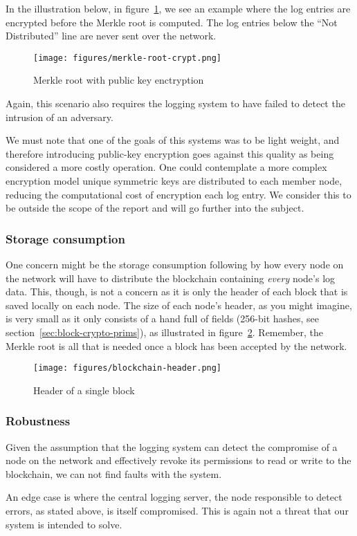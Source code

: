 In the illustration below, in figure~\ref{fig:merkle-root-crypt}, we
see an example where the log entries are encrypted before the Merkle
root is computed. The log entries below the ``Not Distributed'' line
are never sent over the network.

\begin{figure}[H]
  \centering
  \texttt{[image: figures/merkle-root-crypt.png]}
  \caption{\label{fig:merkle-root-crypt} Merkle root with public key enctryption}
\end{figure}

Again, this scenario also requires the logging system to have failed
to detect the intrusion of an adversary.

We must note that one of the goals of this systems was to be light
weight, and therefore introducing public-key encryption goes against
this quality as being considered a more costly operation. One could
contemplate a more complex encryption model unique symmetric keys are
distributed to each member node, reducing the computational cost of
encryption each log entry. We consider this to be outside the scope of
the report and will go further into the subject.

\subsubsection{Storage consumption}
One concern might be the storage consumption following by how every
node on the network will have to distribute the blockchain containing
\textit{every} node's log data. This, though, is not a concern as it
is only the header of each block that is saved locally on each
node. The size of each node's header, as you might imagine, is very
small as it only consists of a hand full of fields (256-bit hashes,
see section~\ref{sec:block-crypto-prims}), as illustrated in
figure~\ref{fig:blockchain-header}. Remember, the Merkle root is all
that is needed once a block has been accepted by the network.

\begin{figure}[H]
  \centering
  \texttt{[image: figures/blockchain-header.png]}
  \caption{\label{fig:blockchain-header} Header of a single block}
\end{figure}


\subsubsection{Robustness}
Given the assumption that the logging system can detect the compromise
of a node on the network and effectively revoke its permissions to
read or write to the blockchain, we can not find faults with the
system.

An edge case is where the central logging server, the node responsible
to detect errors, as stated above, is itself compromised. This is
again not a threat that our system is intended to solve.
